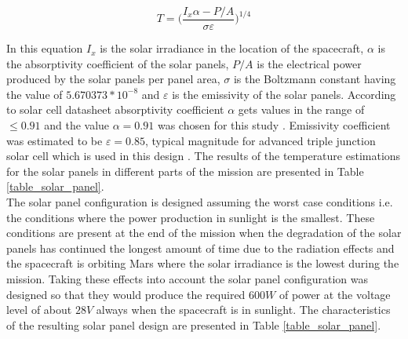 \documentclass[a4paper, oneside, 11pt]{article}
\begin{document}
\begin{equation}
T=\Bigg(\frac{I_x\alpha-P/A}{\sigma\varepsilon}\Bigg)^{1/4}
\label{equation_Stefan_Boltzmann}
\end{equation}

In this equation $I_x$ is the solar irradiance in the location of the spacecraft, $\alpha$ is the absorptivity coefficient of the solar panels, $P/A$ is the electrical power produced by the solar panels per panel area, $\sigma$ is the Boltzmann constant having the value of $5.670373*10^{-8}$ and $\varepsilon$ is the emissivity of the solar panels. According to solar cell datasheet absorptivity coefficient $\alpha$ gets values in the range of $\leq 0.91$ and the value $\alpha=0.91$ was chosen for this study \cite{Solar_cell}. Emissivity coefficient was estimated to be $\varepsilon=0.85$, typical magnitude for advanced triple junction solar cell which is used in this design \cite{Solar_cell_emissivity}. The results of the temperature estimations for the solar panels in different parts of the mission are presented in Table \ref{table_solar_panel}.\\

\noindent The solar panel configuration is designed assuming the worst case conditions i.e. the conditions where the power production in sunlight is the smallest. These conditions are present at the end of the mission when the degradation of the solar panels has continued the longest amount of time due to the radiation effects and the spacecraft is orbiting Mars where the solar irradiance is the lowest during the mission. %
Taking these effects into account the solar panel configuration was designed so that they would produce the required $600W$ of power at the voltage level of about $28V$ always when the spacecraft is in sunlight. The characteristics of the resulting solar panel design are presented in Table \ref{table_solar_panel}.\\
\end{document}
